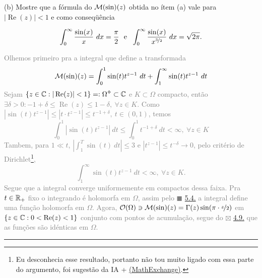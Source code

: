     (b) Mostre que a fórmula do \(\mathcal{M}(\sin)(z)\) obtida no ítem (a) vale para \(|\operatorname{Re}(z)| < 1 \) e como conseqüência 

    \[\int_0^\infty \frac{\sin(x)}{x} \ dx = \frac{\pi}{2} \ \ \text{e} \ \ \int_0^\infty \frac{\sin(x)}{x^{\nicefrac{3}{2}}} \ dx = \sqrt{2\pi}. \]

    \textcolor{gray}{
      Olhemos primeiro pra a integral que define a transformada 
      \[\mathcal{M}(\sin)(z) = \int_0^1\sin(t)t^{z-1} \ dt + \int_1^\infty \sin(t) t^{z-1} \ dt\]
      Sejam \(\{z\in \C : |\operatorname{Re}(z)|< 1\} =: \Omega\ab \subset \C\) e \(K\subset \Omega\) compacto, então \(\exists \delta > 0 : -1 + \delta \leq \operatorname{Re}(z) \leq 1 - \delta, \ \forall z\in K \). Como \(|\sin(t) t^{z-1}| \leq |t\cdot t^{z-1}| \leq t^{-1 + \delta}, \ t \in (0,1)\), temos   
      \[\int_0^1 |\sin(t)t^{z-1}| \ dt \leq \int_0^1 t^{-1+\delta} \ dt < \infty, \ \forall z\in K\]
      Tambem, para \(1 \ll t \),  \(\left|\int_1^T\sin(t) \ dt\right| \leq 3\) e \(|t^{z-1}| \leq t^{-\delta} \to 0\), pelo critério de Dirichlet\footnote{Eu desconhecia esse resultado, portanto não tou muito ligado com essa parte do argumento, foi sugestão da IA  + \href{https://math.stackexchange.com/questions/141048/dirichlets-test-for-convergence-of-improper-integrals}{(MathExchange)}.},  
      \[\int_1^\infty \sin(t)t^{z-1} \ dt  < \infty, \ \forall z\in K. \]
      Segue que a integral converge uniformemente em compactos dessa faixa. Pra \(t \in \mathbb{R}_+\) fixo o integrando é holomorfa em \(\Omega\), assim pelo \(\blacksquare\) \hyperlink{thm33}{5.4.} \cite[pag. 56]{shakarchi} a integral define uma função holomorfa em \(\Omega\). Agora, \( \mathcal{O}(\Omega)\ni \mathcal{M}(\sin)(z) = \Gamma(z) \sin(\pi \cdot \nicefrac{z}{2})\) em \(\{z\in \mathbb{C} : 0 < \operatorname{Re}(z)< 1\}\) conjunto com pontos de acumulação, segue do {\scriptsize\(\boxtimes\)} \hyperlink{coro33}{4.9.} \cite[pag. 52]{shakarchi} que as funções são idénticas em \(\Omega\). 
      \vspace{0.2cm}
      \hrule
}
